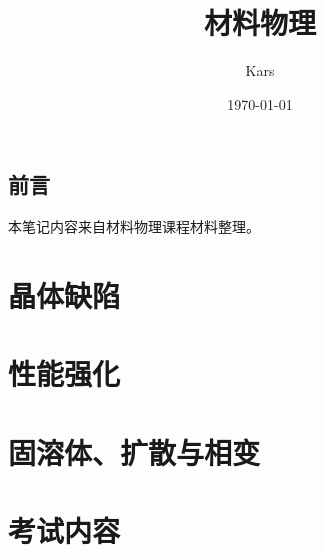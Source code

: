 \documentclass[12pt]{book}
\title{材料物理}
\author{Kars}
\date{\today}
\numberwithin{equation}{section}
\begin{document}
\maketitle



\tableofcontents
{}

\clearpage
\chapter*{前言}
	本笔记内容来自材料物理课程材料整理。


\part{晶体缺陷}
	
	
	
\part{性能强化}
	
\part{固溶体、扩散与相变}
	
	
	
\part{考试内容}
	
\printindex
\end{document}

